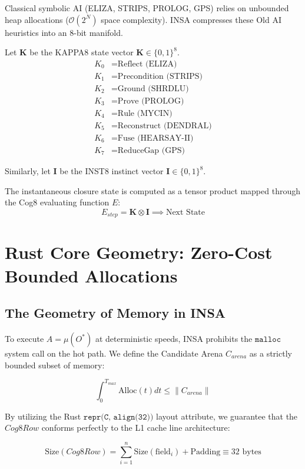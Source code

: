 \documentclass[11pt,twoside,a4paper]{book}
\begin{document}
Classical symbolic AI (ELIZA, STRIPS, PROLOG, GPS) relies on unbounded heap allocations ($\mathcal{O}(2^N)$ space complexity). INSA compresses these Old AI heuristics into an 8-bit manifold.

Let $\mathbf{K}$ be the KAPPA8 state vector $\mathbf{K} \in \{0,1\}^8$.
\begin{align*}
K_0 &= \text{Reflect (ELIZA)} \\
K_1 &= \text{Precondition (STRIPS)} \\
K_2 &= \text{Ground (SHRDLU)} \\
K_3 &= \text{Prove (PROLOG)} \\
K_4 &= \text{Rule (MYCIN)} \\
K_5 &= \text{Reconstruct (DENDRAL)} \\
K_6 &= \text{Fuse (HEARSAY-II)} \\
K_7 &= \text{ReduceGap (GPS)}
\end{align*}

Similarly, let $\mathbf{I}$ be the INST8 instinct vector $\mathbf{I} \in \{0,1\}^8$.

The instantaneous closure state is computed as a tensor product mapped through the Cog8 evaluating function $E$:
\begin{equation}
E_{step} = \mathbf{K} \otimes \mathbf{I} \implies \text{Next State}
\end{equation}

\chapter{Rust Core Geometry: Zero-Cost Bounded Allocations}
\section{The Geometry of Memory in INSA}

To execute $A = \mu(O^*)$ at deterministic speeds, INSA prohibits the $\texttt{malloc}$ system call on the hot path. We define the Candidate Arena $C_{arena}$ as a strictly bounded subset of memory:

\begin{equation}
\int_{0}^{T_{max}} \text{Alloc}(t) dt \leq \| C_{arena} \|
\end{equation}

By utilizing the Rust $\texttt{repr(C, align(32))}$ layout attribute, we guarantee that the $Cog8Row$ conforms perfectly to the L1 cache line architecture:

\begin{equation}
\text{Size}(Cog8Row) = \sum_{i=1}^{n} \text{Size}(\text{field}_i) + \text{Padding} \equiv 32 \text{ bytes}
\end{equation}
\end{document}
